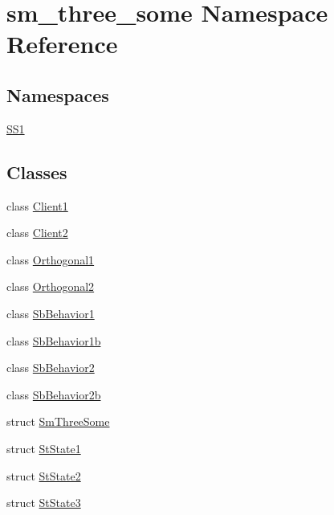 \hypertarget{namespacesm__three__some}{}\section{sm\+\_\+three\+\_\+some Namespace Reference}
\label{namespacesm__three__some}
\subsection*{Namespaces}
\begin{DoxyCompactItemize}
\item 
 \hyperlink{namespacesm__three__some_1_1SS1}{S\+S1}
\end{DoxyCompactItemize}
\subsection*{Classes}
\begin{DoxyCompactItemize}
\item 
class \hyperlink{classsm__three__some_1_1Client1}{Client1}
\item 
class \hyperlink{classsm__three__some_1_1Client2}{Client2}
\item 
class \hyperlink{classsm__three__some_1_1Orthogonal1}{Orthogonal1}
\item 
class \hyperlink{classsm__three__some_1_1Orthogonal2}{Orthogonal2}
\item 
class \hyperlink{classsm__three__some_1_1SbBehavior1}{Sb\+Behavior1}
\item 
class \hyperlink{classsm__three__some_1_1SbBehavior1b}{Sb\+Behavior1b}
\item 
class \hyperlink{classsm__three__some_1_1SbBehavior2}{Sb\+Behavior2}
\item 
class \hyperlink{classsm__three__some_1_1SbBehavior2b}{Sb\+Behavior2b}
\item 
struct \hyperlink{structsm__three__some_1_1SmThreeSome}{Sm\+Three\+Some}
\item 
struct \hyperlink{structsm__three__some_1_1StState1}{St\+State1}
\item 
struct \hyperlink{structsm__three__some_1_1StState2}{St\+State2}
\item 
struct \hyperlink{structsm__three__some_1_1StState3}{St\+State3}
\end{DoxyCompactItemize}
